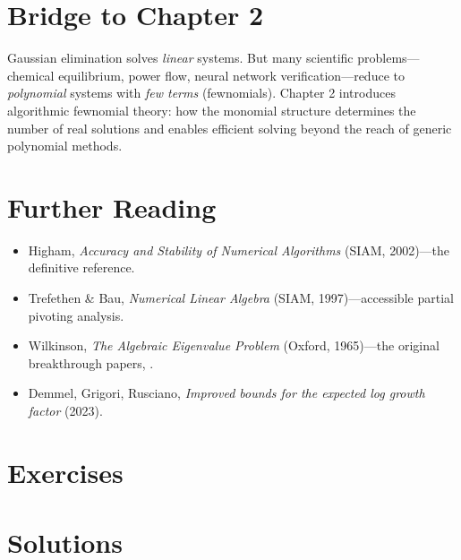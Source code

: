 \section{Bridge to Chapter 2}
\label{sec:ge:bridge}

Gaussian elimination solves \emph{linear} systems. But many scientific problems---chemical equilibrium, power flow, neural network verification---reduce to \emph{polynomial} systems with \emph{few terms} (fewnomials). Chapter 2 introduces algorithmic fewnomial theory: how the monomial structure determines the number of real solutions and enables efficient solving beyond the reach of generic polynomial methods.

\section{Further Reading}
\label{sec:ge:refs}

\begin{itemize}
    \item Higham, \textit{Accuracy and Stability of Numerical Algorithms} (SIAM, 2002)---the definitive reference.
    \item Trefethen \& Bau, \textit{Numerical Linear Algebra} (SIAM, 1997)---accessible partial pivoting analysis.
    \item Wilkinson, \textit{The Algebraic Eigenvalue Problem} (Oxford, 1965)---the original breakthrough papers, \cite{urschel2025numerical}.
    \item Demmel, Grigori, Rusciano, \textit{Improved bounds for the expected log growth factor} (2023).
\end{itemize}

\section{Exercises}
\section{Solutions}
\label{sec:ge:solutions}

